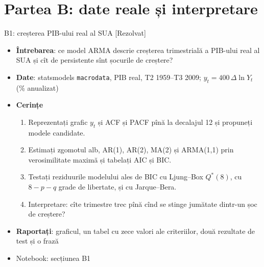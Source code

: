 \section{Partea B: date reale și interpretare}

\begin{frame}{B1: creșterea PIB-ului real al SUA [Rezolvat]}
\itemsize{\footnotesize}
\begin{itemize}
\item \textbf{Întrebarea}: ce model ARMA descrie creșterea trimestrială a PIB-ului real al SUA și cît de persistente sînt șocurile de creștere?
\item \textbf{Date}: statsmodels \texttt{macrodata}, PIB real, T2 1959--T3 2009; $y_t = 400\,\Delta\ln Y_t$ (\% anualizat)
\item \textbf{Cerințe}
\begin{enumerate}
    \item Reprezentați grafic $y_t$ și ACF și PACF pînă la decalajul 12 și propuneți modele candidate.
    \item Estimați zgomotul alb, AR(1), AR(2), MA(2) și ARMA(1,1) prin verosimilitate maximă și tabelați AIC și BIC.
    \item Testați reziduurile modelului ales de BIC cu Ljung--Box $Q^*(8)$, cu $8 - p - q$ grade de libertate, și cu Jarque--Bera.
    \item Interpretare: cîte trimestre trec pînă cînd se stinge jumătate dintr-un șoc de creștere?
\end{enumerate}
\item \textbf{Raportați}: graficul, un tabel cu zece valori ale criteriilor, două rezultate de test și o frază
\item Notebook: secțiunea B1
\end{itemize}
\end{frame}

